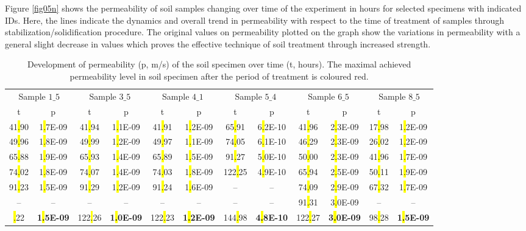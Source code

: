 \documentclass[algorithms,article,submit,pdftex,moreauthors]{Definitions/mdpi}
\begin{document}
Figure \ref{fig05n} shows the permeability of soil samples changing over time of the experiment in hours for selected specimens with indicated IDs. Here, the lines indicate the dynamics and overall trend in permeability with respect to the time of treatment of samples through stabilization/solidification procedure. The original values on permeability plotted on the graph show the variations in permeability with a general slight decrease in values which proves the effective technique of soil treatment through increased strength. 

\begin{table}[H] 
\caption{Development of permeability (p, m/s) of the soil specimen over time (t, hours). The maximal achieved permeability level in soil specimen after the period of treatment is coloured red.\label{tab02}}
\renewcommand{\arraystretch}{1.1}
\begin{adjustbox}{width=1\textwidth}
\begin{tabular}{cc|cc|cc|cc|cc|cc}
\toprule
\multicolumn{2}{c}{Sample $1\_5$} & \multicolumn{2}{c}{Sample $3\_5$} & \multicolumn{2}{c}{Sample $4\_1$} & \multicolumn{2}{c}{Sample $5\_4$} & \multicolumn{2}{c}{Sample $6\_5$} & \multicolumn{2}{c}{Sample $8\_5$}\\
\cmidrule(lr){1-2}\cmidrule(lr){3-4}\cmidrule(lr){5-6}\cmidrule(lr){7-8}\cmidrule(lr){9-10}\cmidrule(lr){11-12}
t & p & t & p & t & p & t & p & t & p & t & p\\
\midrule
41\hl{.}90 &1\hl{.}7E-09 & 41\hl{.}94 &1\hl{.}1E-09 & 41\hl{.}91 & 1\hl{.}2E-09 & 65\hl{.}91 & 6\hl{.}2E-10 & 41\hl{.}96 & 2\hl{.}3E-09 & 17\hl{.}98 & 1\hl{.}2E-09 \\
49\hl{.}96 &1\hl{.}8E-09 & 49\hl{.}99 &1\hl{.}2E-09 & 49\hl{.}97 & 1\hl{.}1E-09 & 74\hl{.}05 & 6\hl{.}1E-10 & 46\hl{.}29 & 2\hl{.}3E-09 & 26\hl{.}02 & 1\hl{.}2E-09 \\
65\hl{.}88 &1\hl{.}9E-09 & 65\hl{.}93 &1\hl{.}4E-09 & 65\hl{.}89 & 1\hl{.}5E-09 & 91\hl{.}27 & 5\hl{.}0E-10 & 50\hl{.}00 & 2\hl{.}3E-09 & 41\hl{.}96 & 1\hl{.}7E-09 \\
74\hl{.}02 &1\hl{.}8E-09 & 74\hl{.}07 &1\hl{.}4E-09 & 74\hl{.}03 & 1\hl{.}8E-09 & 122\hl{.}25 & 4\hl{.}9E-10 & 65\hl{.}94 & 2\hl{.}5E-09 & 50\hl{.}11 & 1\hl{.}9E-09 \\
91\hl{.}23 &1\hl{.}5E-09 & 91\hl{.}29 &1\hl{.}2E-09 & 91\hl{.}24 & 1\hl{.}6E-09 & -- &-- & 74\hl{.}09 & 2\hl{.}9E-09 & 67\hl{.}32 & 1\hl{.}7E-09 \\
-- &-- & -- & -- & -- & -- & -- &-- & 91\hl{.}31 & 3\hl{.}0E-09 & -- & --\\ \addlinespace
\hline
122\hl{.}22 & \textbf{1\hl{.}5E-09} & 122\hl{.}26 & \textbf{1\hl{.}0E-09} &122\hl{.}23 & \textbf{1\hl{.}2E-09} & 144\hl{.}98 & \textbf{4\hl{.}8E-10} & 122\hl{.}27 & \textbf{3\hl{.}0E-09} & 98\hl{.}28 & \textbf{1\hl{.}5E-09}\\
\bottomrule
\end{tabular}
\end{adjustbox}
\end{table}
\end{document}
